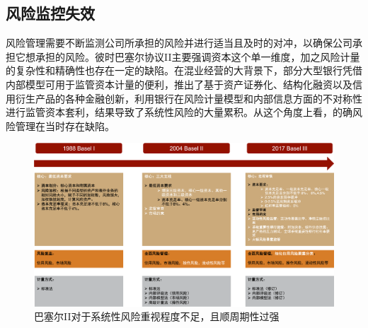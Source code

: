 \subsection{风险监控失效}\label{sec:4}
风险管理需要不断监测公司所承担的风险并进行适当且及时的对冲，以确保公司承担它想承担的风险。彼时巴塞尔协议II主要强调资本这个单一维度，加之风险计量的复杂性和精确性也存在一定的缺陷。在混业经营的大背景下，部分大型银行凭借内部模型可用于监管资本计量的便利，推出了基于资产证券化、结构化融资以及信用衍生产品的各种金融创新，利用银行在风险计量模型和内部信息方面的不对称性进行监管资本套利，结果导致了系统性风险的大量累积。从这个角度上看，的确风险管理在当时存在缺陷。
\begin{figure}[H]
    \includegraphics[width=\linewidth]{img/basel.png}
    \caption{巴塞尔II对于系统性风险重视程度不足，且顺周期性过强}
\end{figure}


